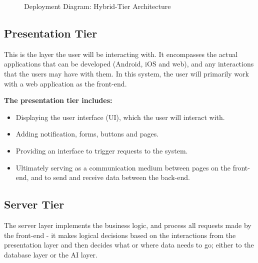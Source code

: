 \documentclass[a4paper,12pt]{article}
\begin{document}
\begin{adjustwidth}{2.5em}{0pt}
\begin{flushleft}
\begin{figure}[h]
					 	\caption{Deployment Diagram: Hybrid-Tier Architecture}
					 	\label{fig:Deployment}
				 	\end{figure}
			\end{flushleft}
		
			\subsection{Presentation Tier}
			\begin{flushleft}
			This is the layer the user will be interacting with. It encompasses the actual applications that can be developed (Android, iOS and web), and any interactions that the users may have with them. In this system, the user will primarily work with a web application as the front-end.
			\newline 
			
			\textbf{The presentation tier includes:}
			\begin{itemize}
				\item Displaying the user interface (UI), which the user will interact with. 
				\item Adding notification, forms, buttons and pages. 
				\item Providing an interface to trigger requests to the system. 
				\item Ultimately serving as a communication medium between pages on the front-end, and to send and receive data between the back-end.
			\end{itemize}
			\end{flushleft}
	
			\subsection{Server Tier}
			\begin{flushleft}
			The server layer implements the business logic, and process all requests made by the front-end - it makes logical decisions based on the interactions from the presentation layer and then decides what or where data needs to go; either to the database layer or the AI layer.
			\newline
			

\end{flushleft}
\end{adjustwidth}
\end{document}

